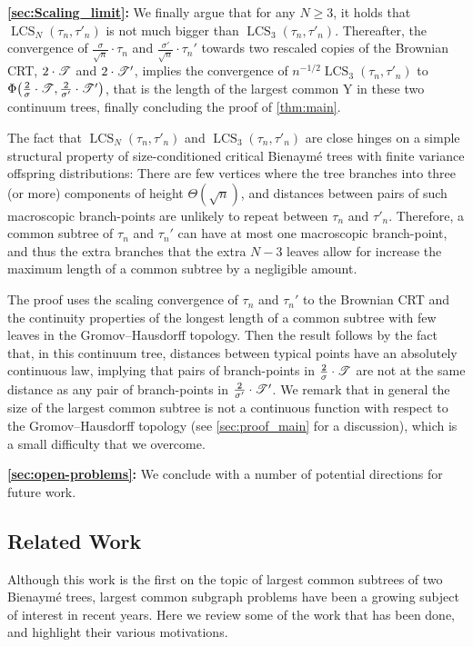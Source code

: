 \documentclass[11pt,reqno]{amsart}
\newcommand{\LCS}{\operatorname{LCS}}
\begin{document}
{\bf \cref{sec:Scaling_limit}:} We finally argue that for any $N\ge 3$, it holds that $\LCS_N(\tau_n, \tau'_n)$ is not much bigger than $\LCS_3(\tau_n, \tau'_n)$. Thereafter, the convergence of $\frac{\sigma}{\sqrt{n}}\cdot \tau_n$ and $\frac{\sigma'}{\sqrt{n}}\cdot \tau_n'$ towards two rescaled copies of the Brownian CRT, $2\cdot \mathscr{T}$ and $2\cdot \mathscr{T}'$, implies the convergence of $n^{-1/2}\LCS_3(\tau_n, \tau'_n)$ to $\Phi\big(\tfrac{2}{\sigma}\cdot\mathscr{T},\tfrac{2}{\sigma'}\cdot\mathscr{T}'\big)$, that is the length of the largest common Y in these two continuum trees, finally concluding the proof of \cref{thm:main}.
\smallskip

The fact that $\LCS_N(\tau_n, \tau'_n)$ and $\LCS_3(\tau_n, \tau'_n)$ are close hinges on a simple structural property of size-conditioned critical Bienaym\'{e} trees with finite variance offspring distributions: There are few vertices where the tree branches into three (or more) components of height $\Theta(\sqrt{n})$, and distances between pairs of such macroscopic branch-points are unlikely to repeat between $\tau_n$ and $\tau'_n$. 
Therefore, a common subtree of $\tau_n$ and $\tau_n'$ can have at most one macroscopic branch-point, and thus the extra branches that the extra $N-3$ leaves allow for increase the maximum length of a common subtree by a negligible amount.
\smallskip

The proof uses the scaling convergence of $\tau_n$ and $\tau_n'$ to the Brownian CRT and the continuity properties of the longest length of a common subtree with few leaves in the Gromov--Hausdorff topology. Then the result follows by the fact that, in this continuum tree, distances between typical points have an absolutely continuous law, implying that pairs of branch-points in $\tfrac{2}{\sigma}\cdot \mathscr{T}$ are not at the same distance as any pair of branch-points in $\tfrac{2}{\sigma'}\cdot \mathscr{T}'$.
We remark that in general the size of the largest common subtree is not a continuous function with respect to the Gromov--Hausdorff topology (see \cref{sec:proof_main} for a discussion), which is a small difficulty that we overcome.


\medskip
{\bf \cref{sec:open-problems}:} We conclude with a number of potential directions for future work. 




\subsection{Related Work}


Although this work is the first on the topic of largest common subtrees of two Bienaym\'{e} trees, largest common subgraph problems have been a growing subject of interest in recent years. Here we review some of the work that has been done, and highlight their various motivations.
\smallskip
\end{document}
